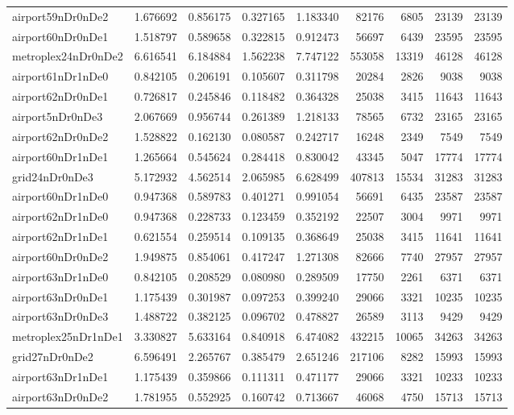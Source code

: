 \begin{longtable}{|l|r|r|r|r|r|r|r|r|}
airport59nDr0nDe2 & 1.676692 & 0.856175 & 0.327165 & 1.183340 & 82176 & 6805 & 23139 & 23139 \\
airport60nDr0nDe1 & 1.518797 & 0.589658 & 0.322815 & 0.912473 & 56697 & 6439 & 23595 & 23595 \\
metroplex24nDr0nDe2 & 6.616541 & 6.184884 & 1.562238 & 7.747122 & 553058 & 13319 & 46128 & 46128 \\
airport61nDr1nDe0 & 0.842105 & 0.206191 & 0.105607 & 0.311798 & 20284 & 2826 & 9038 & 9038 \\
airport62nDr0nDe1 & 0.726817 & 0.245846 & 0.118482 & 0.364328 & 25038 & 3415 & 11643 & 11643 \\
airport5nDr0nDe3 & 2.067669 & 0.956744 & 0.261389 & 1.218133 & 78565 & 6732 & 23165 & 23165 \\
airport62nDr0nDe2 & 1.528822 & 0.162130 & 0.080587 & 0.242717 & 16248 & 2349 & 7549 & 7549 \\
airport60nDr1nDe1 & 1.265664 & 0.545624 & 0.284418 & 0.830042 & 43345 & 5047 & 17774 & 17774 \\
grid24nDr0nDe3 & 5.172932 & 4.562514 & 2.065985 & 6.628499 & 407813 & 15534 & 31283 & 31283 \\
airport60nDr1nDe0 & 0.947368 & 0.589783 & 0.401271 & 0.991054 & 56691 & 6435 & 23587 & 23587 \\
airport62nDr1nDe0 & 0.947368 & 0.228733 & 0.123459 & 0.352192 & 22507 & 3004 & 9971 & 9971 \\
airport62nDr1nDe1 & 0.621554 & 0.259514 & 0.109135 & 0.368649 & 25038 & 3415 & 11641 & 11641 \\
airport60nDr0nDe2 & 1.949875 & 0.854061 & 0.417247 & 1.271308 & 82666 & 7740 & 27957 & 27957 \\
airport63nDr1nDe0 & 0.842105 & 0.208529 & 0.080980 & 0.289509 & 17750 & 2261 & 6371 & 6371 \\
airport63nDr0nDe1 & 1.175439 & 0.301987 & 0.097253 & 0.399240 & 29066 & 3321 & 10235 & 10235 \\
airport63nDr0nDe3 & 1.488722 & 0.382125 & 0.096702 & 0.478827 & 26589 & 3113 & 9429 & 9429 \\
metroplex25nDr1nDe1 & 3.330827 & 5.633164 & 0.840918 & 6.474082 & 432215 & 10065 & 34263 & 34263 \\
grid27nDr0nDe2 & 6.596491 & 2.265767 & 0.385479 & 2.651246 & 217106 & 8282 & 15993 & 15993 \\
airport63nDr1nDe1 & 1.175439 & 0.359866 & 0.111311 & 0.471177 & 29066 & 3321 & 10233 & 10233 \\
airport63nDr0nDe2 & 1.781955 & 0.552925 & 0.160742 & 0.713667 & 46068 & 4750 & 15713 & 15713 \\

\end{longtable}
